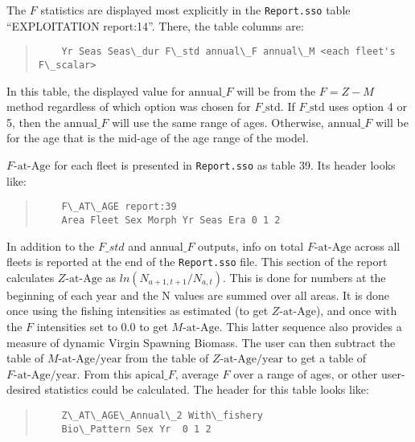 
The $F$ statistics are displayed most explicitly in the \texttt{Report.sso} table ``EXPLOITATION report:14''. There, the table columns are:
\begin{quote}
	\begin{verbatim}
	Yr Seas Seas\_dur F\_std annual\_F annual\_M <each fleet's F\_scalar>
	\end{verbatim}
\end{quote}

In this table, the displayed value for $\text{annual\_}F$ will be from the $F=Z-M$ method regardless of which option was chosen for $F\text{\_std}$. If $F\text{\_std}$ uses option 4 or 5, then the $\text{annual\_}F$ will use the same range of ages. Otherwise, $\text{annual\_}F$ will be for the age that is the mid-age of the age range of the model.

$F\text{-at-Age}$ for each fleet is presented in \texttt{Report.sso} as table 39. Its header looks like:
\begin{quote}
	\begin{verbatim}
	F\_AT\_AGE report:39
	Area Fleet Sex Morph Yr Seas Era 0 1 2
	\end{verbatim}
\end{quote}

In addition to the $F\_std$ and $\text{annual\_}F$ outputs, info on total $F\text{-at-Age}$ across all fleets is reported at the end of the \texttt{Report.sso} file. This section of the report calculates $Z\text{-at-Age}$ as $ln(N_{a+1,t+1}/N_{a,t})$. This is done for numbers at the beginning of each year and the N values are summed over all areas. It is done once using the fishing intensities as estimated (to get $Z\text{-at-Age}$), and once with the $F$ intensities set to 0.0 to get $M\text{-at-Age}$. This latter sequence also provides a measure of dynamic Virgin Spawning Biomass. The user can then subtract the table of $M\text{-at-Age/year}$ from the table of $Z\text{-at-Age/year}$ to get a table of $F\text{-at-Age/year}$. From this $\text{apical\_}F$, average $F$ over a range of ages, or other user-desired statistics could be calculated. The header for this table looks like:
\begin{quote}
	\begin{verbatim}
	Z\_AT\_AGE\_Annual\_2 With\_fishery
	Bio\_Pattern Sex Yr  0 1 2
	\end{verbatim}
\end{quote}

